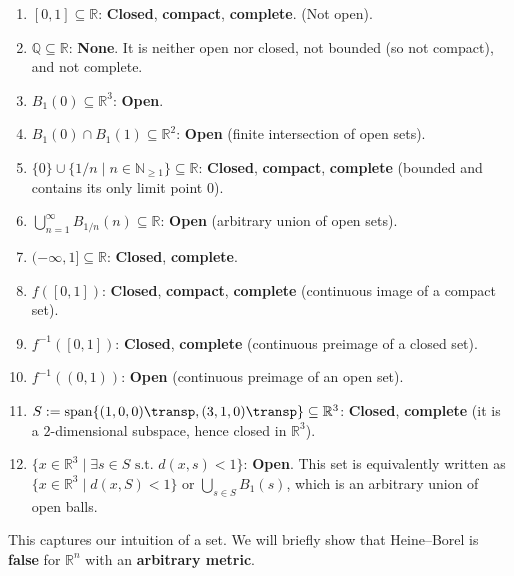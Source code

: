 \begin{exercisesolution}
\begin{enumerate}[label=\textbf{(\alph*)}]
  \item $[0,1] \subseteq \mathbb{R}$: \textbf{Closed}, \textbf{compact}, \textbf{complete}. (Not open).
  \item $\mathbb{Q} \subseteq \mathbb{R}$: \textbf{None}. It is neither open nor closed, not bounded (so not compact), and not complete.
  \item $B_1(0) \subseteq \mathbb{R}^3$: \textbf{Open}.
  \item $B_1(0) \cap B_1(1) \subseteq \mathbb{R}^2$: \textbf{Open} (finite intersection of open sets).
  \item $\{0\} \cup \{1/n \mid n \in \mathbb{N}_{\ge 1}\} \subseteq \mathbb{R}$: \textbf{Closed}, \textbf{compact}, \textbf{complete} (bounded and contains its only limit point $0$).
  \item $\bigcup_{n=1}^\infty B_{1/n}(n) \subseteq \mathbb{R}$: \textbf{Open} (arbitrary union of open sets).
  \item $(-\infty, 1] \subseteq \mathbb{R}$: \textbf{Closed}, \textbf{complete}.
  \item $f([0,1])$: \textbf{Closed}, \textbf{compact}, \textbf{complete} (continuous image of a compact set).
  \item $f^{-1}([0,1])$: \textbf{Closed}, \textbf{complete} (continuous preimage of a closed set).
  \item $f^{-1}((0,1))$: \textbf{Open} (continuous preimage of an open set).
  \item $S := \operatorname{span}\{(1,0,0)\transp, (3,1,0)\transp\} \subseteq \mathbb{R}^3$: \textbf{Closed}, \textbf{complete} (it is a $2$-dimensional subspace, hence closed in $\mathbb{R}^3$).
  \item $\{x \in \mathbb{R}^3 \mid \exists s \in S \text{ s.t.\ } d(x, s) < 1\}$: \textbf{Open}. This set is equivalently written as $\{x \in \mathbb{R}^3 \mid d(x, S) < 1\}$ or $\bigcup_{s \in S} B_1(s)$, which is an arbitrary union of open balls.
\end{enumerate}
\end{exercisesolution}

This captures our intuition of a  set. We will briefly show that Heine--Borel is
\textbf{false} for $\mathbb{R}^n$ with an \textbf{arbitrary metric}.

